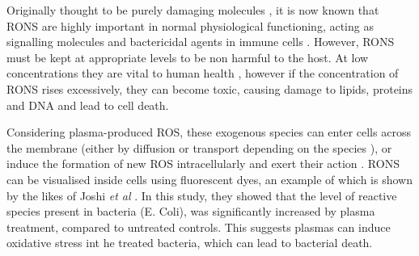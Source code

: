 \documentclass[11pt, oneside]{article}   	%
\begin{document}
Originally thought to be purely damaging molecules \cite{Harman1955aging}, it is now known that RONS are highly important in normal physiological functioning, acting as signalling molecules and bactericidal agents in immune cells \cite{Thannickal2000reactive}.
However, RONS must be kept at appropriate levels to be non harmful to the host.
At low concentrations they are vital to human health \cite{Fang2004antimicrobial}, however if the concentration of RONS rises excessively, they can become toxic, causing damage to lipids, proteins and DNA \cite{PhamHuy2008free} and lead to cell death.

%
Considering plasma-produced ROS, these exogenous species can enter cells across the membrane (either by diffusion or transport depending on the species \cite{Bienert2006membrane}), or induce the formation of new ROS intracellularly and exert their action \cite{Haertel2014nonthermal}.
RONS can be visualised inside cells using fluorescent dyes, an example of which is shown by the likes of Joshi \textit{et al} \cite{Joshi2011nonthermal}.
In this study, they showed that the level of reactive species present in bacteria (E. Coli), was significantly increased by plasma treatment, compared to untreated controls.
This suggests plasmas can induce oxidative stress int he treated bacteria, which can lead to bacterial death.
\end{document}

